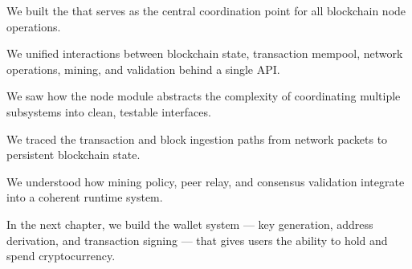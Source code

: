 \begin{chaptersummary}
\item We built the  that serves as the central coordination point for all blockchain node operations.
\item We unified interactions between blockchain state, transaction mempool, network operations, mining, and validation behind a single API.
\item We saw how the node module abstracts the complexity of coordinating multiple subsystems into clean, testable interfaces.
\item We traced the transaction and block ingestion paths from network packets to persistent blockchain state.
\item We understood how mining policy, peer relay, and consensus validation integrate into a coherent runtime system.
\end{chaptersummary}

In the next chapter, we build the wallet system --- key generation, address derivation, and transaction signing --- that gives users the ability to hold and spend cryptocurrency.
